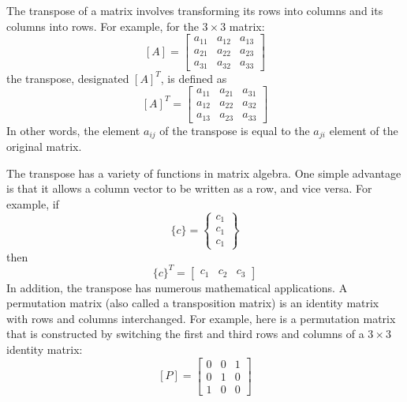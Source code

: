\documentclass[../main.tex]{subfiles}
\begin{document}
The transpose of a matrix involves transforming its rows into columns and its columns into rows. For example, for the $3 \times 3$ matrix:
$$
[A]=\left[\begin{array}{lll}
a_{11} & a_{12} & a_{13} \\
a_{21} & a_{22} & a_{23} \\
a_{31} & a_{32} & a_{33}
\end{array}\right]
$$
the transpose, designated $[A]^{T}$, is defined as
$$
[A]^{T}=\left[\begin{array}{lll}
a_{11} & a_{21} & a_{31} \\
a_{12} & a_{22} & a_{32} \\
a_{13} & a_{23} & a_{33}
\end{array}\right]
$$
In other words, the element $a_{i j}$ of the transpose is equal to the $a_{j i}$ element of the original matrix.

The transpose has a variety of functions in matrix algebra. One simple advantage is that it allows a column vector to be written as a row, and vice versa. For example, if
$$
\{c\}=\left\{\begin{array}{l}
c_{1} \\
c_{1} \\
c_{1}
\end{array}\right\}
$$
then
$$
\{c\}^{T}=\left[\begin{array}{lll}
c_{1} & c_{2} & c_{3}
\end{array}\right]
$$
In addition, the transpose has numerous mathematical applications.
A permutation matrix (also called a transposition matrix) is an identity matrix with rows and columns interchanged. For example, here is a permutation matrix that is constructed by switching the first and third rows and columns of a $3 \times 3$ identity matrix:
$$
[P]=\left[\begin{array}{lll}
0 & 0 & 1 \\
0 & 1 & 0 \\
1 & 0 & 0
\end{array}\right]
$$
\end{document}
